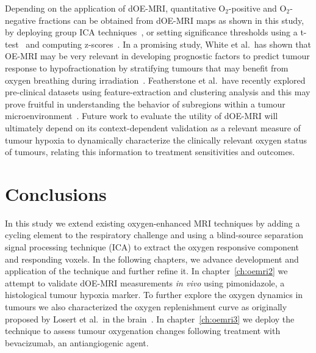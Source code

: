 Depending on the application of \acs{dOE-MRI}, quantitative O$_2$-positive and O$_2$-negative fractions can be obtained from \acs{dOE-MRI} maps as shown in this study, by deploying group \acs{ICA} techniques~\cite{Calhoun:2009jr}, or setting significance thresholds using a t-test~\cite{Greicius:2004ck} and computing z-scores~\cite{McKeown:1998wd}.
In a promising study, White et al.\ has shown that OE-MRI may be very relevant in developing prognostic factors to predict tumour response to hypofractionation by stratifying tumours that may benefit from oxygen breathing during irradiation~\cite{White:2016fz}.
Featherstone et al.\ have recently explored pre-clinical datasets using feature-extraction and clustering analysis and this may prove fruitful in understanding the behavior of subregions within a tumour microenvironment~\cite{Featherstone:2018cn}.
Future work to evaluate the utility of \acs{dOE-MRI} will ultimately depend on its context-dependent validation as a relevant measure of tumour hypoxia to dynamically characterize the clinically relevant oxygen status of tumours, relating this information to treatment sensitivities and outcomes.

\section{Conclusions}
In this study we extend existing oxygen-enhanced MRI techniques by adding a cycling element to the respiratory challenge and using a blind-source separation signal processing technique (\acs{ICA}) to extract the oxygen responsive component and responding voxels.
In the following chapters, we advance development and application of the technique and further refine it. 
In chapter~\ref{ch:oemri2} we attempt to validate \acs{dOE-MRI} measurements \emph{in vivo} using pimonidazole, a histological tumour hypoxia marker.
To further explore the oxygen dynamics in tumours we also characterized the oxygen replenishment curve as originally proposed by Losert et al.\ in the brain~\cite{Losert:2002gt}.
In chapter~\ref{ch:oemri3} we deploy the technique to assess tumour oxygenation changes following treatment with bevacizumab, an antiangiogenic agent.

\endinput